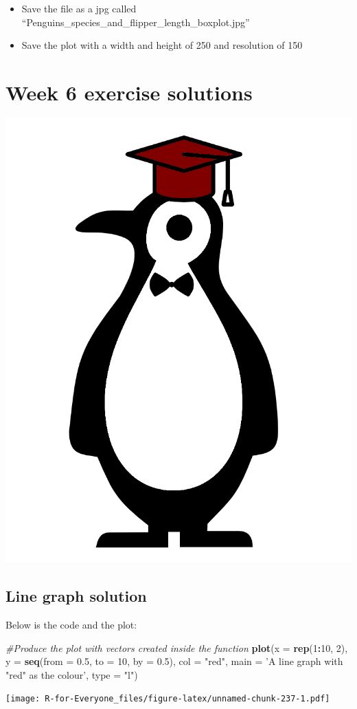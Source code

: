 \documentclass[]{book}
\newenvironment{Shaded}{\begin{snugshade}}{\end{snugshade}}
\newcommand{\KeywordTok}[1]{\textcolor[rgb]{0.13,0.29,0.53}{\textbf{#1}}}
\newcommand{\DataTypeTok}[1]{\textcolor[rgb]{0.13,0.29,0.53}{#1}}
\newcommand{\DecValTok}[1]{\textcolor[rgb]{0.00,0.00,0.81}{#1}}
\newcommand{\FloatTok}[1]{\textcolor[rgb]{0.00,0.00,0.81}{#1}}
\newcommand{\StringTok}[1]{\textcolor[rgb]{0.31,0.60,0.02}{#1}}
\newcommand{\CommentTok}[1]{\textcolor[rgb]{0.56,0.35,0.01}{\textit{#1}}}
\newcommand{\OperatorTok}[1]{\textcolor[rgb]{0.81,0.36,0.00}{\textbf{#1}}}
\newcommand{\NormalTok}[1]{#1}
\providecommand{\tightlist}{%
  \setlength{\itemsep}{0pt}\setlength{\parskip}{0pt}}
\begin{document}
\begin{itemize}
\tightlist
\item
  Save the file as a jpg called
  ``Penguins\_species\_and\_flipper\_length\_boxplot.jpg''
\item
  Save the plot with a width and height of 250 and resolution of 150
\end{itemize}

\chapter{Week 6 exercise solutions}\label{week-6-exercise-solutions}

\begin{center}\includegraphics[width=0.2\linewidth]{figures/penguin_solutions} \end{center}

\section{Line graph solution}\label{line-graph-solution}

Below is the code and the plot:

\begin{Shaded}
\begin{Highlighting}[]
\CommentTok{#Produce the plot with vectors created inside the function}
\KeywordTok{plot}\NormalTok{(}\DataTypeTok{x =} \KeywordTok{rep}\NormalTok{(}\DecValTok{1}\OperatorTok{:}\DecValTok{10}\NormalTok{, }\DecValTok{2}\NormalTok{), }
     \DataTypeTok{y =} \KeywordTok{seq}\NormalTok{(}\DataTypeTok{from =} \FloatTok{0.5}\NormalTok{, }\DataTypeTok{to =} \DecValTok{10}\NormalTok{, }\DataTypeTok{by =} \FloatTok{0.5}\NormalTok{),}
     \DataTypeTok{col =} \StringTok{"red"}\NormalTok{,}
     \DataTypeTok{main =} \StringTok{'A line graph with "red" as the colour'}\NormalTok{,}
     \DataTypeTok{type =} \StringTok{"l"}\NormalTok{)}
\end{Highlighting}
\end{Shaded}

\texttt{[image: R-for-Everyone\_files/figure-latex/unnamed-chunk-237-1.pdf]}
\end{document}
